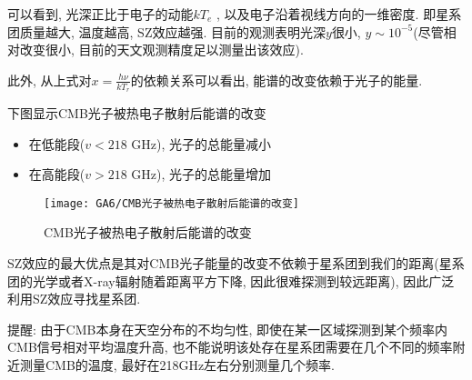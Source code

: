 可以看到, 光深正比于电子的动能$kT_e$ , 以及电子沿着视线方向的一维密度. 即星系团质量越大, 温度越高, SZ效应越强. 目前的观测表明光深$y$很小, $y\sim 10^{-5}$(尽管相对改变很小, 目前的天文观测精度足以测量出该效应). 

此外, 从上式对$x=\frac{h\nu}{kT_r}$的依赖关系可以看出, 能谱的改变依赖于光子的能量. 

下图显示CMB光子被热电子散射后能谱的改变
\begin{itemize}\small
    \item 在低能段($v<218$ GHz), 光子的总能量减小
    \item 在高能段($v>218$ GHz), 光子的总能量增加
\end{itemize}

\begin{figure}[!htb]
    \centering
    \texttt{[image: GA6/CMB光子被热电子散射后能谱的改变]}
    \caption{CMB光子被热电子散射后能谱的改变}
\end{figure}

SZ效应的最大优点是其对CMB光子能量的改变不依赖于星系团到我们的距离(星系团的光学或者X-ray辐射随着距离平方下降, 因此很难探测到较远距离), 因此广泛利用SZ效应寻找星系团. 

\small
提醒: 由于CMB本身在天空分布的不均匀性, 即使在某一区域探测到某个频率内CMB信号相对平均温度升高, 也不能说明该处存在星系团需要在几个不同的频率附近测量CMB的温度, 最好在218GHz左右分别测量几个频率. 
\normalsize